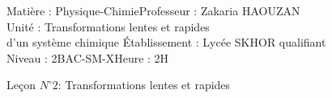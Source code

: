\documentclass[12pt]{article}
\author{Zakaria HAOUZAN}
\date{\today}
\newcommand\headerMe[2]{\noindent{}#1\hfill#2}
\begin{document}
\headerMe{Matière : Physique-Chimie}{Professeur : Zakaria HAOUZAN}\\
\headerMe{Unité : Transformations lentes et rapides\\ d'un système chimique }{Établissement : Lycée SKHOR qualifiant}\\
\headerMe{Niveau : 2BAC-SM-X}{Heure : 2H}\\

\begin{center}

    \Large{Leçon $N^{\circ} 2 $: \color{red} Transformations lentes et rapides }
\end{center}



\end{document}
